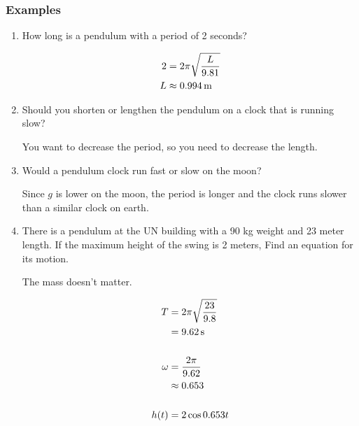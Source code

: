\documentclass{exam}
\begin{document}
  \subsubsection{Examples}
  \begin{enumerate}
    \item How long is a pendulum with a period of 2 seconds?
      \begin{solution}
        \begin{align*}
          2 & = 2 \pi \sqrt{\frac{L}{9.81}} \\
          L & \approx \unit[0.994]{m} \\
        \end{align*}
      \end{solution}

    \item Should you shorten or lengthen the pendulum on a clock that is running slow?
      \begin{solution}
        You want to decrease the period, so you need to decrease the length.
      \end{solution}

    \item Would a pendulum clock run fast or slow on the moon?
      \begin{solution}
        Since $g$ is lower on the moon, the period is longer and the clock runs slower than a similar clock on earth.
      \end{solution}

    \item There is a pendulum at the UN building with a 90 kg weight and 23 meter length.  If the maximum height of the
      swing is 2 meters, Find an equation for its motion.

      \begin{solution}
        The mass doesn't matter.

        \begin{align*}
          T      & = 2 \pi \sqrt{\frac{23}{9.8}} \\
                 & = \unit[9.62]{s} \\
            \\
          \omega & = \frac{2 \pi}{9.62} \\
                 & \approx 0.653 \\
            \\
          h(t)   & = 2 \cos 0.653 t \\
        \end{align*}
      \end{solution}
  \end{enumerate}
\end{document}
